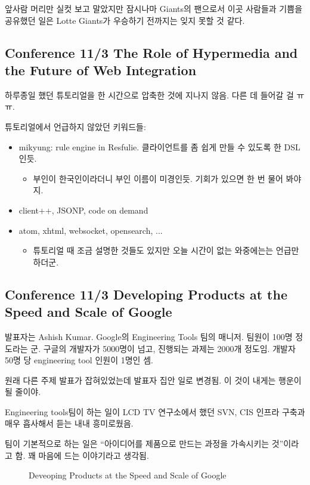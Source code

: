 \documentclass[a4paper]{article}
\begin{document}
앞사람 머리만 실컷 보고 말았지만 잠시나마 Giants의 팬으로서 이곳
사람들과 기쁨을 공유했던 일은 Lotte Giants가 우승하기 전까지는 잊지
못할 것 같다.
 
\subsection{Conference 11/3 The Role of Hypermedia and the Future of
  Web Integration}
 
하루종일 했던 튜토리얼을 한 시간으로 압축한 것에 지나지 않음. 다른 데
들어갈 걸 ㅠㅠ.
 
튜토리얼에서 언급하지 않았던 키워드들:
\begin{itemize}
\item mikyung: rule engine in Resfulie. 클라이언트를 좀 쉽게 만들 수
  있도록 한 DSL인듯.
  \begin{itemize}
  \item 부인이 한국인이라더니 부인 이름이 미경인듯. 기회가 있으면 한 번
    물어 봐야지.
  \end{itemize}
\item client++, JSONP, code on demand
\item atom, xhtml, websocket, opensearch, ...
  \begin{itemize}
  \item 튜토리얼 때 조금 설명한 것들도 있지만 오늘 시간이 없는
    와중에는는 언급만 하더군.
  \end{itemize}
\end{itemize}
 
\subsection{Conference 11/3 Developing Products at the Speed and Scale
  of Google}
 
발표자는 Ashish Kumar. Google의 Engineering Tools 팀의 매니저. 팀원이
100명 정도라는 군.  구글의 개발자가 5000명이 넘고, 진행되는 과제는
2000개 정도임. 개발자 50명 당 engineering tool 인원이 1명인 셈.
 
원래 다른 주제 발표가 잡혀있었는데 발표자 집안 일로 변경됨. 이 것이
내게는 행운이 될 줄이야.
 
Engineering tools팀이 하는 일이 LCD TV 연구소에서 했던 SVN, CIS 인프라
구축과 매우 흡사해서 듣는 내내 흥미로웠음.
 
팀이 기본적으로 하는 일은 ``아이디어를 제품으로 만드는 과정을 가속시키는
것''이라고 함. 꽤 마음에 드는 이야기라고 생각됨.

\begin{figure}[t]
    \begin{Frame}
        \begin{center}
        \end{center}
    \end{Frame}
    \caption{Deveoping Products at the Speed and Scale of Google}
    \label{google}
\end{figure}
 
\end{document}
